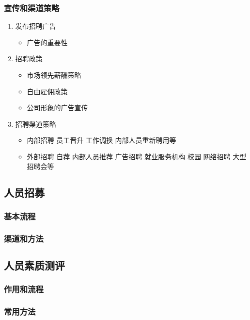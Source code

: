 \documentclass{ctexart}
\begin{document}
\subsubsection{宣传和渠道策略}
\label{sec-2-2-4}
\begin{enumerate}
\item 发布招聘广告
\label{sec-2-2-4-1}
\begin{itemize}
\item 广告的重要性
\end{itemize}
\item 招聘政策
\label{sec-2-2-4-2}
\begin{itemize}
\item 市场领先薪酬策略
\item 自由雇佣政策
\item 公司形象的广告宣传
\end{itemize}
\item 招聘渠道策略
\label{sec-2-2-4-3}
\begin{itemize}
\item 内部招聘 员工晋升 工作调换 内部人员重新聘用等
\item 外部招聘 自荐 内部人员推荐 广告招聘 就业服务机构 校园 网络招聘 大型招聘会等
\end{itemize}
\end{enumerate}
\subsection{人员招募}
\label{sec-2-3}
\subsubsection{基本流程}
\label{sec-2-3-1}

\subsubsection{渠道和方法}
\label{sec-2-3-2}
\subsection{人员素质测评}
\label{sec-2-4}
\subsubsection{作用和流程}
\label{sec-2-4-1}
\subsubsection{常用方法}
\label{sec-2-4-2}
\end{document}
